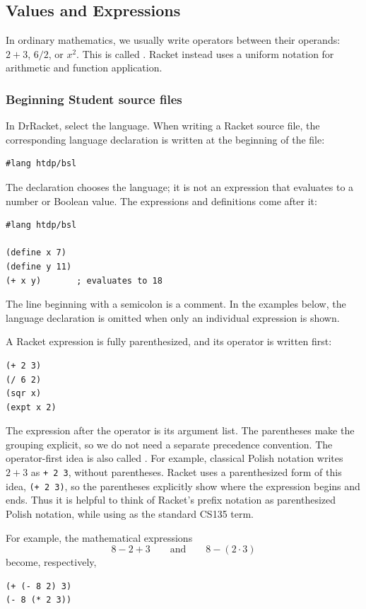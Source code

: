 \subsection{Values and Expressions}
In ordinary mathematics, we usually write operators between their operands:
$2+3$, $6/2$, or $x^2$.  This is called .  Racket
instead uses a uniform notation for arithmetic and function application.

\subsubsection{Beginning Student source files}
In DrRacket, select the  language.  When writing a
Racket source file, the corresponding language declaration is written at the
beginning of the file:
\begin{verbatim}
#lang htdp/bsl
\end{verbatim}
The declaration chooses the language; it is not an expression that evaluates
to a number or Boolean value.  The expressions and definitions come after it:
\begin{verbatim}
#lang htdp/bsl

(define x 7)
(define y 11)
(+ x y)       ; evaluates to 18
\end{verbatim}
The line beginning with a semicolon is a comment.  In the examples below, the
language declaration is omitted when only an individual expression is shown.

\begin{definition}
A Racket expression is fully parenthesized, and its operator is written first:
\begin{verbatim}
(+ 2 3)
(/ 6 2)
(sqr x)
(expt x 2)
\end{verbatim}
The expression after the operator is its argument list.  The parentheses make
the grouping explicit, so we do not need a separate precedence convention.
The operator-first idea is also called .  For example,
classical Polish notation writes $2+3$ as \texttt{+ 2 3}, without parentheses.
Racket uses a parenthesized form of this idea, \texttt{(+ 2 3)}, so the
parentheses explicitly show where the expression begins and ends.  Thus it is
helpful to think of Racket's prefix notation as parenthesized Polish notation,
while using  as the standard CS135 term.

For example, the mathematical expressions
\[
  8-2+3 \qquad\text{and}\qquad 8-(2\mathbin{\cdot}3)
\]
become, respectively,
\begin{verbatim}
(+ (- 8 2) 3)
(- 8 (* 2 3))
\end{verbatim}
\end{definition}

